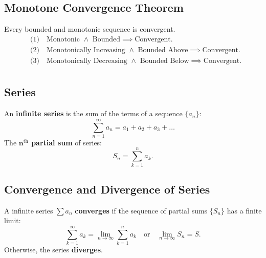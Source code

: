 \documentclass[a4paper,11pt]{article}
\begin{document}


\subsection{Monotone Convergence Theorem}

\begin{tcolorbox}
    Every bounded and monotonic sequence is convergent.
    \[
    \begin{aligned}
        &\text{(1)} \quad \text{Monotonic } \land \text{ Bounded} 
        \implies \text{Convergent}. \\[8pt]
        &\text{(2)} \quad \text{Monotonically Increasing } \land \text{ Bounded Above} 
        \implies \text{Convergent}. \\[8pt]
        &\text{(3)} \quad \text{Monotonically Decreasing } \land \text{ Bounded Below} 
        \implies \text{Convergent}. \\[8pt]
    \end{aligned}
    \]
\end{tcolorbox}




\subsection{Series}

\begin{tcolorbox}
    An \textbf{infinite series} is the sum of the terms of a sequence $\{a_n\}$:
    \[
    \sum_{n=1}^{\infty} a_n = a_1 + a_2 + a_3 + \dots
    \]
    The \textbf{$\boldsymbol{n}^\text{th}$ partial sum} of series:
    \[
    S_n = \sum_{k=1}^{n} a_k.
    \]
\end{tcolorbox}




\subsection{Convergence and Divergence of Series}

\begin{tcolorbox}
    A infinite series $\textstyle \sum a_n$ \textbf{converges} if the sequence of partial sums $\{ S_n \}$ has a finite limit:
    \[
    \sum_{k=1}^{\infty} a_k = \lim_{n \to \infty} \sum_{k=1}^{n} a_k \quad \text{or} \quad \lim_{n \to \infty} S_n = S.
    \]
    Otherwise, the series \textbf{diverges}.
\end{tcolorbox}
\end{document}
